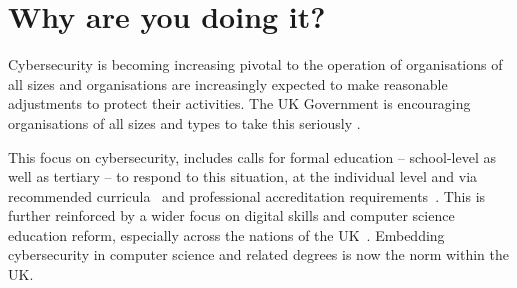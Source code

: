 \documentclass[sigconf]{acmart}
\begin{document}
\section{Why are you doing it?}	
\begin{comment}
\begin{quote}
	``{\emph{...[need to] change the culture in your organisation around cyber security; to try to do for cyber what has been done so successfully for health and safety, for example, over the last ten years --- to get everybody to take it seriously; to take the risk management process seriously and drive that down through the organisation.}}''\\
	\hfill Robert Hannigan~\cite{Hannigan2019a}, former Director of GCHQ
\end{quote}
\end{comment}

Cybersecurity is becoming increasing pivotal to the operation of organisations of all sizes and organisations are increasingly expected to make reasonable adjustments to protect their activities. The UK Government is encouraging organisations of all sizes and types to take this seriously \cite{Hannigan2019a}. 

\begin{comment}

This need to build knowledge, skills and capacity in the area of cybersecurity has also led to the establishment of a number of strategic policy initiatives from a number of national governments, for example the publication in 2016 of the UK's Cyber Security Strategy~\cite{ukcyberstrategy:2016} (along with the setting up of the National Cyber Security Centre, as well as increased scrutiny of the resilience of the UK's critical national infrastructure~\cite{lordscyberreport:2018}; also industry-focused initiatives such as Cyber Essentials~\cite{ncsc2017ce}, the EU Cybersecurity Act~\cite{eucyber2018} (which reinforces the mandate of the EU Agency for Cybersecurity: ENISA, the European Union Agency for Network and Information and Security), or the National Initiative for Cybersecurity Education (NICE) in the USA~\cite{NICE}.

\end{comment}

This focus on cybersecurity, includes calls for formal education -- school-level as well as tertiary -- to respond to this situation, at the individual level and via recommended curricula~\cite{mcgettrick-et-al:sigcse2014,ACM2017b} and professional accreditation requirements~\cite{BCS2018a,NCSC2017}. This is further reinforced by a wider focus on digital skills and computer science education reform, especially across the nations of the UK~\cite{brown-et-al:toce2014,murphy-et-al:programming2017,tryfonas+crick:petra2018,moller+crick:jce2018}. Embedding cybersecurity in computer science and related degrees is now the norm within the UK. %
\end{document}
